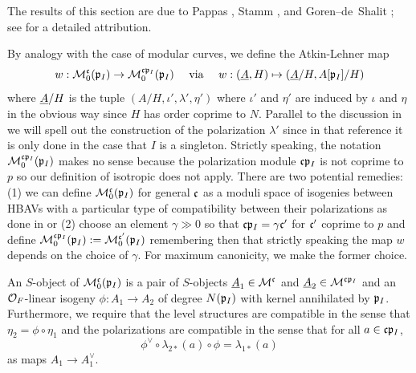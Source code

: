 \documentclass[main.tex]{subfiles}
\begin{document}
{
{\color{red} 
The results of this section are due to Pappas \cite{pappas:arithmetic}, Stamm \cite{stamm:iwahori}, and Goren--de~Shalit \cite{goren_deshalit:foliations_shimura}; see \cite[p.~13]{goren_deshalit:foliations_shimura} for a detailed attribution.}


By analogy with the case of modular curves, we define the Atkin-Lehner map 
\[ w : \mathcal{M}^{\mathfrak{c}}_0(\mathfrak{p}_I) \to \mathcal{M}^{\mathfrak{c} \mathfrak{p}_I}_0(\mathfrak{p}_I) \quad \text{ via } \quad w : (\underline{A}, H) \mapsto (\underline{A}/H, A[\mathfrak{p}_I]/H) \] 
where $\underline{A}/H$ is the tuple $(A/H, \iota', \lambda', \eta')$ where $\iota'$ and $\eta'$ are induced by $\iota$ and $\eta$ in the obvious way since $H$ has order coprime to $N$. Parallel to the discussion in \cite[p.14]{goren_deshalit:foliations_shimura} we will spell out the construction of the polarization $\lambda'$ since in that reference it is only done in the case that $I$ is a singleton. Strictly speaking, the notation $\mathcal{M}^{\mathfrak{c} \mathfrak{p}_I}_0(\mathfrak{p}_I)$ makes no sense because the polarization module $\mathfrak{c} \mathfrak{p}_I$ is not coprime to $p$ so our definition of isotropic does not apply. There are two potential remedies: (1) we can define $\mathcal{M}^{\mathfrak{c}}_0(\mathfrak{p}_I)$ for general $\mathfrak{c}$ as a moduli space of isogenies between HBAVs with a particular type of compatibility between their polarizations as done in \cite{pappas:arithmetic} or (2) choose an element $\gamma \gg 0$ so that $\mathfrak{c} \mathfrak{p}_I = \gamma \mathfrak{c}'$ for $\mathfrak{c}'$ coprime to $p$ and define $\mathcal{M}^{\mathfrak{c} \mathfrak{p}_I}_0(\mathfrak{p}_I) := \mathcal{M}^{\mathfrak{c}'}_0(\mathfrak{p}_I)$ remembering then that strictly speaking the map $w$ depends on the choice of $\gamma$. For maximum canonicity, we make the former choice. 

\begin{defn}
An $S$-object of $\mathcal{M}^{\mathfrak{c}}_0(\mathfrak{p}_I)$ is a pair of $S$-objects $\underline{A}_1 \in \mathcal{M}^{\mathfrak{c}}$ and $\underline{A}_2 \in \mathcal{M}^{\mathfrak{c} \mathfrak{p}_I}$ and an $\mathcal{O}_F$-linear isogeny $\phi : A_1 \to A_2$ of degree $N(\mathfrak{p}_I)$ with kernel annihilated by $\mathfrak{p}_I$. Furthermore, we require that the level structures are compatible in the sense that $\eta_2 = \phi \circ \eta_1$ and the polarizations are compatible in the sense that for all $a \in \mathfrak{c} \mathfrak{p}_I$,
\[ \phi^{\vee} \circ \lambda_{2*}(a) \circ \phi = \lambda_{1*}(a) \]
as maps $A_1 \to A_1^{\vee}$. 
\end{defn}

}
\end{document}
